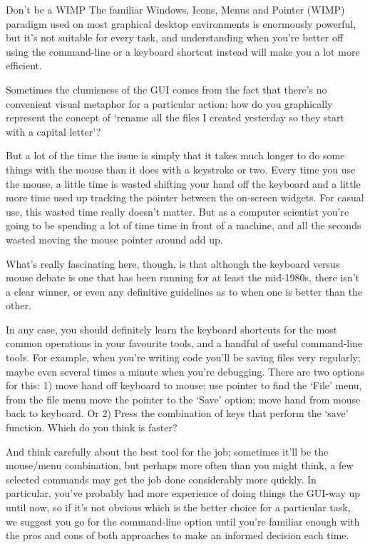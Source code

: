 \begin{diversion}{Don't be a WIMP}
The familiar Windows, Icons, Menus and Pointer (WIMP) paradigm used on most graphical desktop environments is enormously powerful, but it's not suitable for every task, and understanding when you're better off using the command-line or a keyboard shortcut instead will make you a lot more efficient.

Sometimes the clumisness of the GUI comes from the fact that there's no convenient visual metaphor for a particular action; how do you graphically represent the concept of `rename all the files I created yesterday so they start with a capital letter'? 

But a lot of the time the issue is simply that it takes much longer to do some things with the mouse than it does with a keystroke or two. Every time you use the mouse, a little time is wasted shifting your hand off the keyboard and a little more time used up tracking the pointer between the on-screen widgets. For casual use, this wasted time really doesn't matter. But as a computer scientist you're going to be spending a lot of time time in front of a machine, and all the seconds wasted moving the mouse pointer around add up. 

What's really fascinating here, though, is that although the keyboard versus mouse debate is one that has been running for at least the mid-1980s, there isn't a clear winner, or even any definitive guidelines as to when one is better than the other. 

In any case, you should definitely learn the keyboard shortcuts for the most common operations in your favourite tools, and a handful of useful command-line tools. For example, when you're writing code you'll be saving files very regularly; maybe even several times a minute when you're debugging. There are two options for this: 1) move hand off keyboard to mouse; use pointer to find the `File' menu, from the file menu move the pointer to the `Save' option; move hand from mouse back to keyboard. Or 2) Press the combination of keys that perform the `save' function. Which do you think is faster?

And think carefully about the best tool for the job; sometimes it'll be the mouse/menu combination, but perhaps more often than you might think, a few selected commands may get the job done considerably more quickly. In particular, you've probably had more experience of doing things the GUI-way up until now, so if it's not obvious which is the better choice for a particular task, we suggest you go for the command-line option until you're familiar enough with the pros and cons of both approaches to make an informed decision each time.
\end{diversion}


